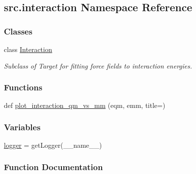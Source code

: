 \hypertarget{namespacesrc_1_1interaction}{}\subsection{src.\+interaction Namespace Reference}
\label{namespacesrc_1_1interaction}
\subsubsection*{Classes}
\begin{DoxyCompactItemize}
\item 
class \hyperlink{classsrc_1_1interaction_1_1Interaction}{Interaction}
\begin{DoxyCompactList}\small\item\em Subclass of Target for fitting force fields to interaction energies. \end{DoxyCompactList}\end{DoxyCompactItemize}
\subsubsection*{Functions}
\begin{DoxyCompactItemize}
\item 
def \hyperlink{namespacesrc_1_1interaction_ab1ff2535a4dc386857871ec75b821f91}{plot\+\_\+interaction\+\_\+qm\+\_\+vs\+\_\+mm} (eqm, emm, title=\textquotesingle{}\textquotesingle{})
\end{DoxyCompactItemize}
\subsubsection*{Variables}
\begin{DoxyCompactItemize}
\item 
\hyperlink{namespacesrc_1_1interaction_a34764f82b89cffff442e96b4331f038f}{logger} = get\+Logger(\+\_\+\+\_\+name\+\_\+\+\_\+)
\end{DoxyCompactItemize}


\subsubsection{Function Documentation}
\mbox{\label{namespacesrc_1_1interaction_ab1ff2535a4dc386857871ec75b821f91}} 
